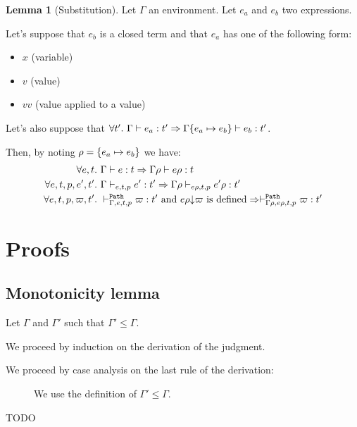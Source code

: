 \documentclass[a4paper]{article}
\theoremstyle{definition}
\newtheorem{lemma}{Lemma}
\begin{document}
        \begin{lemma}[Substitution]
          Let $\Gamma$ an environment. Let $e_a$ and $e_b$ two expressions.

          Let's suppose that $e_b$ is a closed term and that $e_a$ has one of the following form:
          \begin{itemize}
            \item $x$ (variable)
            \item $v$ (value)
            \item $v v$ (value applied to a value)
          \end{itemize}
          Let's also suppose that $\forall t'.\ \Gamma \vdash e_a : t' \Rightarrow \Gamma\subst {e_a} {e_b} \vdash e_b:t'$.
          
          Then, by noting $\rho = \subst {e_a} {e_b}$ we have:
          \begin{align*}
            \forall e,t.\ &\Gamma \vdash e:t \Rightarrow \Gamma\rho \vdash e\rho:t\\
            \forall e,t,p,e',t'.\ &\Gamma \cvdash p {e} {t} e':t' \Rightarrow \Gamma\rho \cvdash p {e\rho} {t} e'\rho:t'\\
            \forall e,t,p,\varpi,t'.\ &\pvdash \Gamma p e t \varpi:t' \text{ and }\occ {e\rho} \varpi\text{ is defined} \Rightarrow \pvdash {\Gamma\rho} p {e\rho} t \varpi:t'
          \end{align*}
        \end{lemma}

        \section{Proofs}

        \subsection{Monotonicity lemma}

        Let $\Gamma$ and $\Gamma'$ such that $\Gamma' \leq \Gamma$.

        We proceed by induction on the derivation of the judgment.

        We proceed by case analysis on the last rule of the derivation:
        
        \begin{description}
          \item[] We use the definition of $\Gamma' \leq \Gamma$.
          \item[TODO] 
        \end{description}
\end{document}
